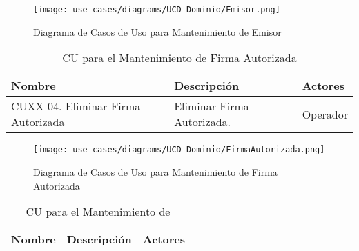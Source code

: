 	\begin{figure}[H]
		\begin{center}
		\label{tab:ucd-entity-emisor}
		\texttt{[image: use-cases/diagrams/UCD-Dominio/Emisor.png]}
		\caption{Diagrama de Casos de Uso para Mantenimiento de Emisor}
		\end{center}
	\end{figure}
	\begin{table}[H]
		\caption{CU para el Mantenimiento de Firma Autorizada}
		\label{uc-entity-firmaautorizada}
		\begin{center}
		\begin{tabularx}{0.90\linewidth}{ X X X }
			\hline
			\textbf{Nombre} & \textbf{Descripci\'on} & \textbf{Actores} \\
			\hline
			CUXX-04. Eliminar Firma Autorizada & Eliminar Firma Autorizada. & Operador \\
			\hline
		\end{tabularx}
		\end{center}
	\end{table}
	
	\begin{figure}[H]
		\begin{center}
		\label{tab:ucd-entity-firmaautorizada}
		\texttt{[image: use-cases/diagrams/UCD-Dominio/FirmaAutorizada.png]}
		\caption{Diagrama de Casos de Uso para Mantenimiento de Firma Autorizada}
		\end{center}
	\end{figure}
	\begin{table}[H]
		\caption{CU para el Mantenimiento de }
		\label{uc-entity-instruccionefectivo}
		\begin{center}
		\begin{tabularx}{0.90\linewidth}{ X X X }
			\hline
			\textbf{Nombre} & \textbf{Descripci\'on} & \textbf{Actores} \\
			\hline
			\hline
		\end{tabularx}
		\end{center}
	\end{table}
	
